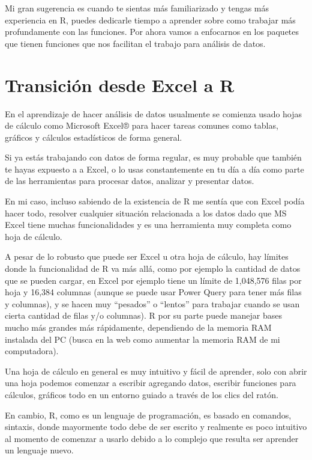 \documentclass[
  letterpaper,
  DIV=11,
  numbers=noendperiod]{scrreprt}
\begin{document}
Mi gran sugerencia es cuando te sientas más familiarizado y tengas más
experiencia en R, puedes dedicarle tiempo a aprender sobre como trabajar
más profundamente con las funciones. Por ahora vamos a enfocarnos en los
paquetes que tienen funciones que nos facilitan el trabajo para análisis
de datos.


\chapter{Transición desde Excel a
R}\label{transiciuxf3n-desde-excel-a-r}

En el aprendizaje de hacer análisis de datos usualmente se comienza
usado hojas de cálculo como Microsoft Excel® para hacer tareas comunes
como tablas, gráficos y cálculos estadísticos de forma general.

Si ya estás trabajando con datos de forma regular, es muy probable que
también te hayas expuesto a a Excel, o lo usas constantemente en tu día
a día como parte de las herramientas para procesar datos, analizar y
presentar datos.

En mi caso, incluso sabiendo de la existencia de R me sentía que con
Excel podía hacer todo, resolver cualquier situación relacionada a los
datos dado que MS Excel tiene muchas funcionalidades y es una
herramienta muy completa como hoja de cálculo.

A pesar de lo robusto que puede ser Excel u otra hoja de cálculo, hay
límites donde la funcionalidad de R va más allá, como por ejemplo la
cantidad de datos que se pueden cargar, en Excel por ejemplo tiene un
límite de 1,048,576 filas por hoja y 16,384 columnas (aunque se puede
usar Power Query para tener más filas y columnas), y se hacen muy
``pesados'' o ``lentos'' para trabajar cuando se usan cierta cantidad de
filas y/o columnas). R por su parte puede manejar bases mucho más
grandes más rápidamente, dependiendo de la memoria RAM instalada del PC
(busca en la web como aumentar la memoria RAM de mi computadora).

Una hoja de cálculo en general es muy intuitivo y fácil de aprender,
solo con abrir una hoja podemos comenzar a escribir agregando datos,
escribir funciones para cálculos, gráficos todo en un entorno guiado a
través de los clics del ratón.

En cambio, R, como es un lenguaje de programación, es basado en
comandos, sintaxis, donde mayormente todo debe de ser escrito y
realmente es poco intuitivo al momento de comenzar a usarlo debido a lo
complejo que resulta ser aprender un lenguaje nuevo.
\end{document}
